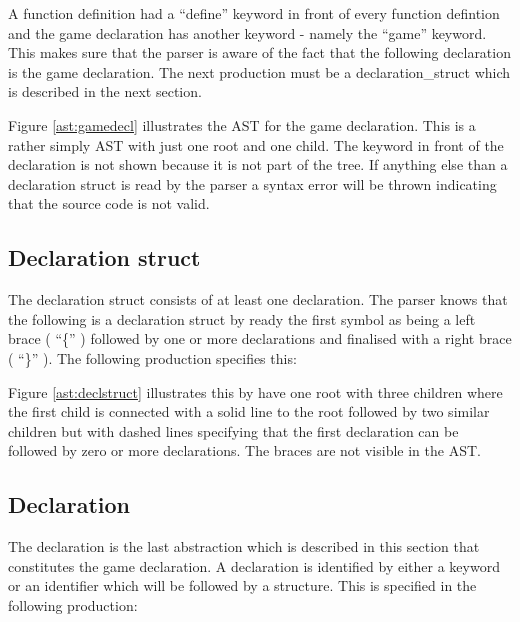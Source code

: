 \begin{ebnf}
\end{ebnf}

A function definition had a ``define'' keyword in front of every function defintion and the game declaration has another keyword - namely the ``game'' keyword. This makes sure that the parser is aware of the fact that the following declaration is the game declaration. The next production must be a declaration\_struct which is described in the next section.



Figure \ref{ast:gamedecl} illustrates the AST for the game declaration. This is a rather simply AST with just one root and one child. The keyword in front of the declaration is not shown because it is not part of the tree. If anything else than a declaration struct is read by the parser a syntax error will be thrown indicating that the source code is not valid.

\subsection{Declaration struct}

The declaration struct consists of at least one declaration. The parser knows that the following is a declaration struct by ready the first symbol as being a left brace ( ``\{'' ) followed by one or more declarations and finalised with a right brace ( ``\}'' ). The following production specifies this:

\begin{ebnf}
\end{ebnf}



Figure \ref{ast:declstruct} illustrates this by have one root with three children where the first child is connected with a solid line to the root followed by two similar children but with dashed lines specifying that the first declaration can be followed by zero or more declarations. The braces are not visible in the AST.

\subsection{Declaration}
The declaration is the last abstraction which is described in this section that constitutes the game declaration. A declaration is identified by either a keyword or an identifier which will be followed by a structure. This is specified in the following production:

